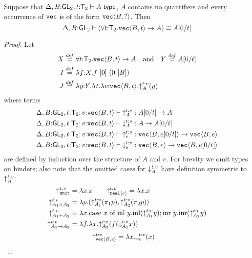 \begin{lemma}\label{lem:transiso}
Suppose that $\Delta,B\mathord:\mathsf{GL}_2,t\mathord:\mathsf{T}_2\vdash A \textup{\textsf{ type}}$, 
$A$ contains no quantifiers and every occurrence of $\textup{\texttt{vec}}$ is of the form $\textup{\texttt{vec}}\langle B,? \rangle$. Then
\[
\Delta,B\mathord:\mathsf{GL}_2\vdash(\forall t\mathord:\mathsf{T}_2.\textup{\texttt{vec}}\langle B,t \rangle\to A)
\cong A[0/t]
\]
\end{lemma}
\begin{proof}
Let 
\begin{align*}
X & \stackrel{\mathit{def}}= \forall t\mathord:\mathsf{T}_2.\textup{\texttt{vec}}\langle B,t \rangle\to A
\quad\text{and}\quad Y \stackrel{\mathit{def}}= A[0/t]\\
I & \stackrel{\mathit{def}}= \lambda f\mathord: X. f\ [0]\ (0\ [B])\\
J & \stackrel{\mathit{def}}= \lambda y\mathord: Y. \Lambda t.\lambda v\mathord:\textup{\texttt{vec}}\langle B,t \rangle. \mathord\uparrow_{A}^{t\mathord:v} (y)
\end{align*}
where terms 
\begin{align*}
&\Delta,B\mathord:\mathsf{GL}_2,t\mathord:\mathsf{T}_2;v\mathord:\textup{\texttt{vec}}\langle B,t \rangle\vdash \mathord\uparrow_{A}^{t\mathord:v} : A[0/t] \to A\\
&\Delta,B\mathord:\mathsf{GL}_2,t\mathord:\mathsf{T}_2;v\mathord:\textup{\texttt{vec}}\langle B,t \rangle\vdash \mathord\downarrow_{A}^{t\mathord:v} : A\to A[0/t]\\
&\Delta,B\mathord:\mathsf{GL}_2,t\mathord:\mathsf{T}_2;v\mathord:\textup{\texttt{vec}}\langle B,t \rangle\vdash \mathord\uparrow_{e}^{t\mathord:v} : \textup{\texttt{vec}}\langle B,e[0/t] \rangle\to\textup{\texttt{vec}}\langle B,e \rangle\\
&\Delta,B\mathord:\mathsf{GL}_2,t\mathord:\mathsf{T}_2;v\mathord:\textup{\texttt{vec}}\langle B,t \rangle\vdash \mathord\downarrow_{e}^{t\mathord:v} : \textup{\texttt{vec}}\langle B,e \rangle\to\textup{\texttt{vec}}\langle B,e[0/t] \rangle
\end{align*}
are defined by induction over the structure of $A$ and $e$. For brevity we omit types on binders;
also note that the omitted cases for $\mathord\downarrow_{A}^{t\mathord:v}$ 
have definition symmetric to $\mathord\uparrow_{A}^{t\mathord:v}$:
\begin{align*}
\mathord\uparrow_{\textup{\texttt{unit}}}^{t\mathord:v} &= \lambda x. x
\qquad 
\mathord\uparrow_{\textup{\texttt{real}}\langle e \rangle}^{t\mathord:v} = \lambda x. x
\\
\mathord\uparrow_{A_1\times A_2}^{t\mathord:v} &= \lambda p. (\mathord\uparrow_{A_1}^{t\mathord:v}(\pi_1 p),\mathord\uparrow_{A_2}^{t\mathord:v}(\pi_2 p))
\\
\mathord\uparrow_{A_1 + A_2}^{t\mathord:v} &= \lambda x.
\textrm{case}\ x\ \textrm{of}\ \textrm{inl}\ y.\textrm{inl}(\mathord\uparrow_{A_1}^{t\mathord:v} y); \textrm{inr}\ y.\textrm{inr}(\mathord\uparrow_{A_2}^{t\mathord:v} y)
\\ 
\mathord\uparrow_{A_1\to A_2}^{t\mathord:v} &= \lambda f. \lambda x. \mathord\uparrow_{A_2}^{t\mathord:v} (f(\mathord\downarrow_{A_1}^{t\mathord:v} x))
\end{align*}
\begin{align*}
\transup{\tyPrim{vec}{B,e}} t v &= \lambda x. \transdn{e}  t v (x) 

\end{align*}
\end{proof}
